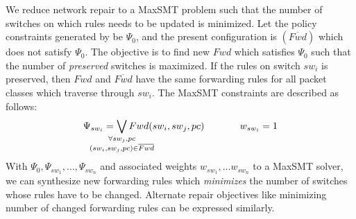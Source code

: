 We reduce network repair to a MaxSMT problem
such that 
the number of switches on which rules needs to be updated is minimized.
 Let
the policy constraints generated by \name be $\Psi_0$, and the present 
configuration is $(\overline{Fwd})$ which does not satisfy $\Psi_0$. The 
objective is to find new $Fwd$ which satisfies $\Psi_0$ such that the number of \emph{preserved} switches 
is maximized. If the rules on switch $sw_i$ is preserved, then $Fwd$ and $\overline{Fwd}$ have the same forwarding rules for all packet classes which
traverse through $sw_i$. The MaxSMT constraints are described as follows:
\begin{equation}
	\Psi_{sw_i} =  
	  \bigvee_{\mathclap{\substack{\forall sw_j, pc \\
			  		(sw_i, sw_j, pc) \in \overline{Fwd}}}} Fwd(sw_i, sw_j, pc) 
			~~~~~~~~~~~ 
			w_{sw_i}= 1
\end{equation}
With $\Psi_0, \Psi_{sw_1}, \ldots, \Psi_{sw_n}$  and associated weights 
$w_{sw_1}, \ldots w_{sw_n}$
to a MaxSMT solver, we can synthesize new forwarding rules 
which \emph{minimizes} the number of switches whose rules have to be changed. 
Alternate
repair objectives like minimizing number of changed forwarding rules 
can be expressed similarly.



 







 